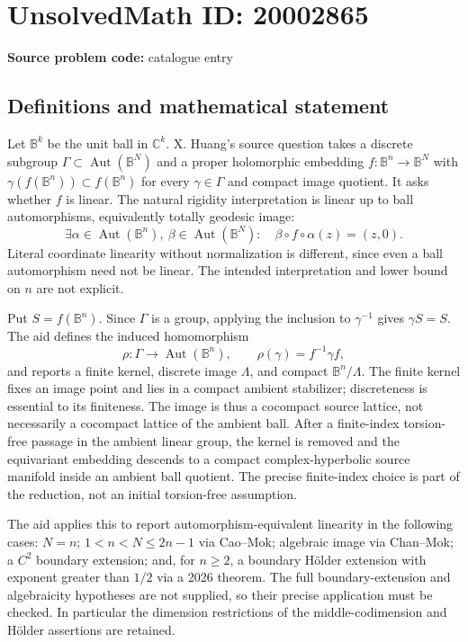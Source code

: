 \documentclass[11pt]{article}
\newcommand{\C}{\mathbb{C}}
\begin{document}
\section*{UnsolvedMath ID: 20002865}
\textbf{Source problem code:} catalogue entry
\subsection{Definitions and mathematical statement}
Let $\mathbb B^k$ be the unit ball in $\C^k$. X. Huang's source question takes a discrete subgroup $\Gamma\subset\operatorname{Aut}(\mathbb B^N)$ and a proper holomorphic embedding $f:\mathbb B^n\to\mathbb B^N$ with $\gamma(f(\mathbb B^n))\subset f(\mathbb B^n)$ for every $\gamma\in\Gamma$ and compact image quotient. It asks whether $f$ is linear. The natural rigidity interpretation is linear up to ball automorphisms, equivalently totally geodesic image:
\[
 \exists\alpha\in\operatorname{Aut}(\mathbb B^n),\ \beta\in\operatorname{Aut}(\mathbb B^N):
 \quad\beta\circ f\circ\alpha(z)=(z,0).
\]
Literal coordinate linearity without normalization is different, since even a ball automorphism need not be linear. The intended interpretation and lower bound on $n$ are not explicit.

Put $S=f(\mathbb B^n)$. Since $\Gamma$ is a group, applying the inclusion to $\gamma^{-1}$ gives $\gamma S=S$. The aid defines the induced homomorphism
\[
 \rho:\Gamma\to\operatorname{Aut}(\mathbb B^n),\qquad
 \rho(\gamma)=f^{-1}\gamma f,
\]
and reports a finite kernel, discrete image $\Lambda$, and compact $\mathbb B^n/\Lambda$. The finite kernel fixes an image point and lies in a compact ambient stabilizer; discreteness is essential to its finiteness. The image is thus a cocompact source lattice, not necessarily a cocompact lattice of the ambient ball. After a finite-index torsion-free passage in the ambient linear group, the kernel is removed and the equivariant embedding descends to a compact complex-hyperbolic source manifold inside an ambient ball quotient. The precise finite-index choice is part of the reduction, not an initial torsion-free assumption.

The aid applies this to report automorphism-equivalent linearity in the following cases: $N=n$; $1<n<N\le2n-1$ via Cao--Mok; algebraic image via Chan--Mok; a $C^2$ boundary extension; and, for $n\ge2$, a boundary H\"older extension with exponent greater than $1/2$ via a 2026 theorem. The full boundary-extension and algebraicity hypotheses are not supplied, so their precise application must be checked. In particular the dimension restrictions of the middle-codimension and H\"older assertions are retained.
\end{document}
